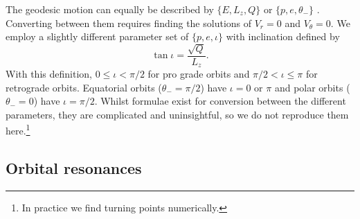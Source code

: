 The geodesic motion can equally be described by $\{E,L_z,Q\}$ or $\{p,e,\theta_-\}$ \citep{Schmidt2002}. Converting between them requires finding the solutions of $V_r = 0$ and $V_\theta = 0$. We employ a slightly different parameter set of $\{p,e,\iota\}$ with inclination defined by \citep{Ryan1996,Glampedakis2002}
\begin{equation}
\tan \iota = \dfrac{\sqrt{Q}}{L_z}.
\end{equation}
With this definition, $0 \leq \iota < \pi/2$ for pro grade orbits and $\pi/2 < \iota \leq \pi$ for retrograde orbits. Equatorial orbits ($\theta_- = \pi/2$) have $\iota = 0$ or $\pi$ and polar orbits ($\theta_- = 0$) have $\iota = \pi/2$. Whilst formulae exist for conversion between the different parameters, they are complicated and uninsightful, so we do not reproduce them here.\footnote{In practice we find turning points numerically.}

\subsection{Orbital resonances}

